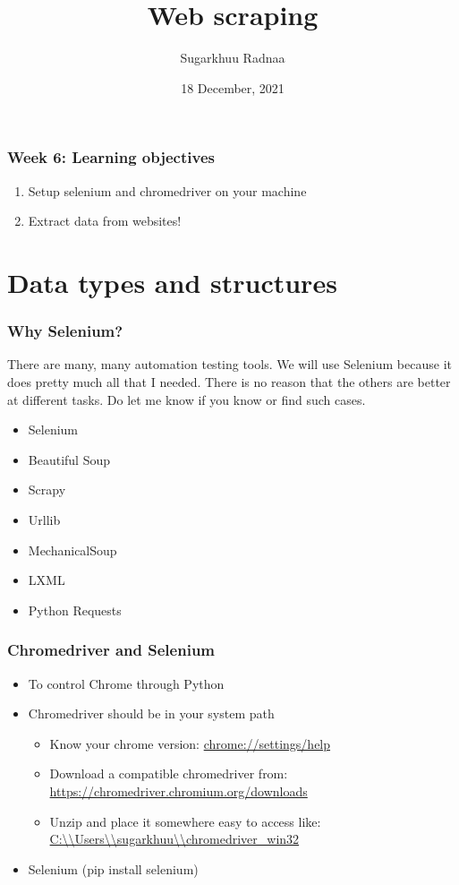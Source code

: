 \documentclass{beamer}
\title[Introduction to Python]{Web scraping}
\author{Sugarkhuu Radnaa}
\institute[]
{
Py4Econ in Ulaanbaatar \\ 
\medskip
\textit{py4econ@gmail.com} 
}
\date{18 December, 2021}  %
\begin{document}
\begin{frame}
\titlepage %
\end{frame}

\begin{frame}
    \frametitle{Week 6: Learning objectives}
    \begin{enumerate}
        \item Setup selenium and chromedriver on your machine
        \item Extract data from websites!
    \end{enumerate}
\end{frame}

\section{Data types and structures} 

\begin{frame}
    \frametitle{Why Selenium?}

    There are many, many automation testing tools. We will use Selenium because it does pretty much all that I needed. There is no reason
    that the others are better at different tasks. Do let me know if you know or find such cases. 

    \begin{itemize}
        \item Selenium
        \item Beautiful Soup
        \item Scrapy
        \item Urllib
        \item MechanicalSoup
        \item LXML
        \item Python Requests
    \end{itemize}
\end{frame}


\begin{frame}
\frametitle{Chromedriver and Selenium}
    \begin{itemize}
        \item To control Chrome through Python
        \item Chromedriver should be in your system path
            \begin{itemize}
                \item Know your chrome version: \url{chrome://settings/help}
                \item Download a compatible chromedriver from: \url{https://chromedriver.chromium.org/downloads}
                \item Unzip and place it somewhere easy to access like: \url{C:\\Users\\sugarkhuu\\chromedriver\_win32}
            \end{itemize}
        \item Selenium (pip install selenium)
    \end{itemize}
\end{frame}
\end{document}
